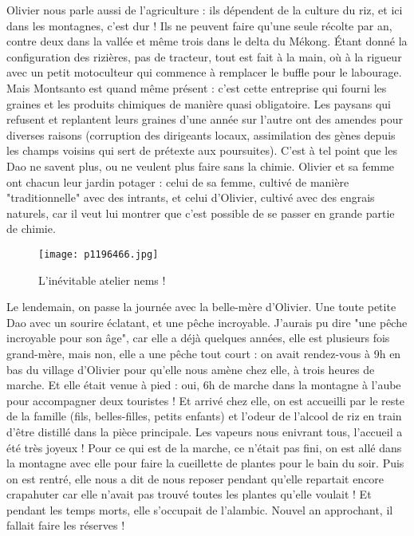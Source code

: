 \documentclass{book}
\begin{document}
Olivier nous parle aussi de l'agriculture : ils dépendent de la culture du riz, et ici dans les montagnes, c'est dur ! Ils ne peuvent faire qu'une seule récolte par an, contre deux dans la vallée et même trois dans le delta du Mékong. Étant donné la configuration des rizières, pas de tracteur, tout est fait à la main, où à la rigueur avec un petit motoculteur qui commence à remplacer le buffle pour le labourage. Mais Montsanto est quand même présent : c'est cette entreprise qui fourni les graines et les produits chimiques de manière quasi obligatoire. Les paysans qui refusent et replantent leurs graines d'une année sur l'autre ont des amendes pour diverses raisons (corruption des dirigeants locaux, assimilation des gènes depuis les champs voisins qui sert de prétexte aux poursuites). C'est à tel point que les Dao ne savent plus, ou ne veulent plus faire sans la chimie. Olivier et sa femme ont chacun leur jardin potager : celui de sa femme, cultivé de manière "traditionnelle" avec des intrants, et celui d'Olivier, cultivé avec des engrais naturels, car il veut lui montrer que c'est possible de se passer en grande partie de chimie.


\begin{figure}[h]
\centering
\texttt{[image: p1196466.jpg]}
\caption*{L'inévitable atelier nems !}
\end{figure}

Le lendemain, on passe la journée avec la belle-mère d'Olivier. Une toute petite Dao avec un sourire éclatant, et une pêche incroyable. J'aurais pu dire "une pêche incroyable pour son âge", car elle a déjà quelques années, elle est plusieurs fois grand-mère, mais non, elle a une pêche tout court : on avait rendez-vous à 9h en bas du village d'Olivier pour qu'elle nous amène chez elle, à trois heures de marche. Et elle était venue à pied : oui, 6h de marche dans la montagne à l'aube pour accompagner deux touristes ! Et arrivé chez elle, on est accueilli par le reste de la famille (fils, belles-filles, petits enfants) et l'odeur de l'alcool de riz en train d'être distillé dans la pièce principale. Les vapeurs nous enivrant tous, l'accueil a été très joyeux ! Pour ce qui est de la marche, ce n'était pas fini, on est allé dans la montagne avec elle pour faire la cueillette de plantes pour le bain du soir. Puis on est rentré, elle nous a dit de nous reposer pendant qu'elle repartait encore crapahuter car elle n'avait pas trouvé toutes les plantes qu'elle voulait ! Et pendant les temps morts, elle s'occupait de l'alambic. Nouvel an approchant, il fallait faire les réserves !
\end{document}
